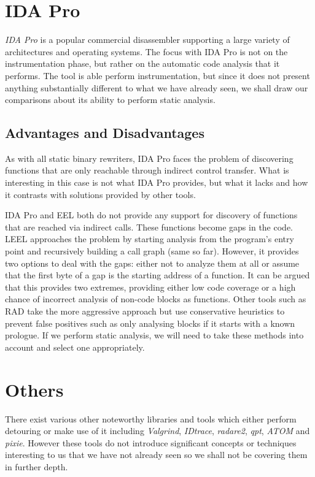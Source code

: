 \section{IDA Pro}

\emph{IDA Pro} is a popular commercial disassembler supporting a large variety of architectures and operating systems\cite{ida,stripped_binary}. The focus with IDA Pro is not on the instrumentation phase, but rather on the automatic code analysis that it performs. The tool is able perform instrumentation, but since it does not present anything substantially different to what we have already seen, we shall draw our comparisons about its ability to perform static analysis.

\subsection{Advantages and Disadvantages}

As with all static binary rewriters, IDA Pro faces the problem of discovering functions that are only reachable through indirect control transfer. What is interesting in this case is not what IDA Pro provides, but what it lacks and how it contrasts with solutions provided by other tools.

IDA Pro and EEL both do not provide any support for discovery of functions that are reached via indirect calls. These functions become gaps in the code. LEEL approaches the problem by starting analysis from the program's entry point and recursively building a call graph (same so far). However, it provides two options to deal with the gaps\cite{leel}: either not to analyze them at all or assume that the first byte of a gap is the starting address of a function. It can be argued that this provides two extremes, providing either low code coverage or a high chance of incorrect analysis of non-code blocks as functions. Other tools such as RAD\cite{rad} take the more aggressive approach but use conservative heuristics to prevent false positives such as only analysing blocks if it starts with a known prologue. If we perform static analysis, we will need to take these methods into account and select one appropriately.

\section{Others}

There exist various other noteworthy libraries and tools which either perform detouring or make use of it including \emph{Valgrind}, \emph{IDtrace}, \emph{radare2}, \emph{qpt}, \emph{ATOM} and \emph{pixie}\cite{valgrind,IDtrace,radare2,qpt,atom,qpt_pixie}. However these tools do not introduce significant concepts or techniques interesting to us that we have not already seen so we shall not be covering them in further depth.
